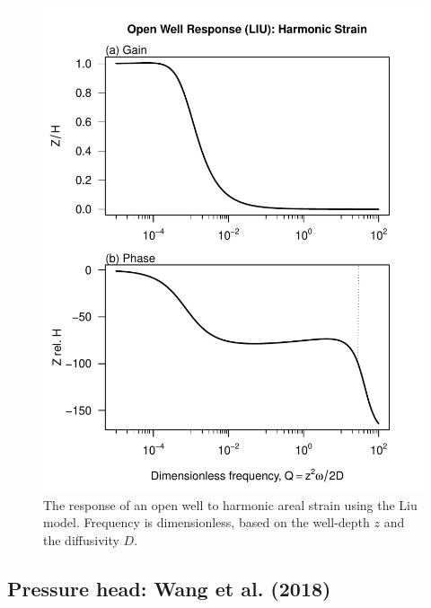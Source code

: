 \documentclass[12pt]{article}\usepackage[]{graphicx}\usepackage[]{color}
\makeatletter
\def\maxwidth{ %
  \ifdim\Gin@nat@width>\linewidth
    \linewidth
  \else
    \Gin@nat@width
  \fi
}
\newenvironment{knitrout}{}{} %
\makeatother
\begin{document}
\begin{figure}[htb!]
\begin{center}
\begin{knitrout}\small
{}\color{fgcolor}
\includegraphics[width=\maxwidth]{figure/LIURESPFIG-1} 

\end{knitrout}
\caption{The response of an open well to harmonic areal strain using
the Liu model. 
Frequency is dimensionless, based on the well-depth $z$ and the diffusivity $D$.
}
\label{fig:owrsp-liu}
\end{center}
\end{figure}



\clearpage
\subsection{Pressure head: Wang et al. (2018)}
\end{document}
